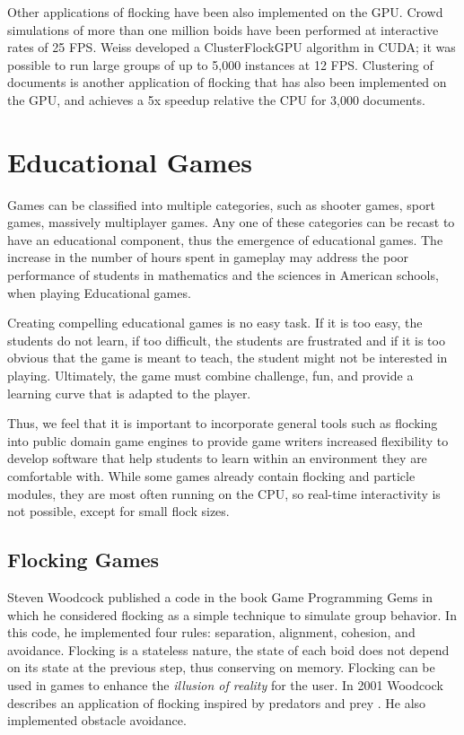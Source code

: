 Other applications of flocking have been also implemented on the GPU.  Crowd simulations of more than one million boids have been performed at interactive rates of 25 FPS\cite{supermassiveCrowd}. Weiss developed a ClusterFlockGPU algorithm in CUDA; it was possible to run large groups of up to 5,000 instances at 12 FPS\cite{SI_GPU}. Clustering of documents is another application of flocking that has also been implemented on the GPU, and achieves a 5x speedup relative the CPU for 3,000 documents\cite{document2}. 

\section{Educational Games}
Games can be classified into multiple categories, such as shooter games, sport games, massively multiplayer games. Any one of these categories can be recast to have an educational component, thus the emergence of educational games. The increase in the number of hours spent in  gameplay may address the poor performance of students in mathematics and the sciences in American schools, when playing Educational games. 

 Creating compelling educational games is no easy task. If it is too easy, the students do not learn, if too difficult, the students are frustrated and if it is too obvious that the game is meant to teach, the student might not be interested in playing. Ultimately, the game must combine challenge, fun, and provide a learning curve that is adapted to the player.

Thus, we feel that it is important to incorporate general tools such as flocking into public domain game engines to provide game writers increased flexibility to develop software that help students to learn within an environment they are comfortable with. While some games already contain flocking and particle modules, they are most often running on the CPU, so real-time interactivity is not possible, except for small flock sizes. 

\subsection{Flocking Games}
Steven Woodcock published a code in the book Game Programming Gems in which he considered flocking as a simple technique to simulate group behavior\cite{gems1}. In this code, he implemented four rules: separation, alignment, cohesion, and avoidance.  Flocking is a stateless nature, the state of each boid does not depend on its state at the previous step, thus conserving on memory. Flocking can be used in games to enhance the \textit{illusion of reality} for the user.  In 2001 Woodcock describes an application of flocking inspired by predators and prey \cite{gems2}. 
He also implemented obstacle avoidance.

